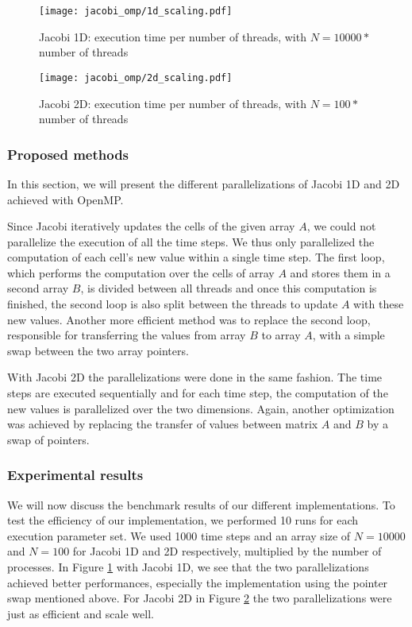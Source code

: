 \begin{figure}
  \texttt{[image: jacobi\_omp/1d\_scaling.pdf]}
  \caption{Jacobi 1D: execution time per number of threads, with $N = 10 000 *$ number of threads}
  \label{fig:j1d_scaling}
\end{figure}
\begin{figure}
  \texttt{[image: jacobi\_omp/2d\_scaling.pdf]}
  \caption{Jacobi 2D: execution time per number of threads, with $N = 100 *$ number of threads}
  \label{fig:j2d_scaling}
\end{figure}

\subsubsection{Proposed methods}\label{jacobi_openmp_methods}
In this section, we will present the different parallelizations of Jacobi 1D and 2D achieved with OpenMP.

 Since Jacobi iteratively updates the cells of the given array $A$, we could not parallelize the execution of all the time steps. We thus only parallelized the computation of each cell’s new value within a single time step. The first loop, which performs the computation over the cells of array $A$ and stores them in a second array $B$, is divided between all threads and once this computation is finished, the second loop is also split between the threads to update $A$ with these new values. Another more efficient method was to replace the second loop, responsible for transferring the values from array $B$ to array $A$, with a simple swap between the two array pointers.

 With Jacobi 2D the parallelizations were done in the same fashion. The time steps are executed sequentially and for each time step, the computation of the new values is parallelized over the two dimensions. Again, another optimization was achieved by replacing the transfer of values between matrix $A$ and $B$ by a swap of pointers.

\subsubsection{Experimental results}\label{experimental_results_jacobi_openmp}
We will now discuss the benchmark results of our different implementations.
To test the efficiency of our implementation, we performed 10 runs for each execution parameter set. We used 1000 time steps and an array size of $N = 10 000$ and $N = 100$ for Jacobi 1D and 2D respectively, multiplied by the number of processes. In Figure \ref{fig:j1d_scaling} with Jacobi 1D, we see that the two parallelizations achieved better performances, especially the implementation using the pointer swap mentioned above. For Jacobi 2D in Figure \ref{fig:j2d_scaling} the two parallelizations were just as efficient and scale well.